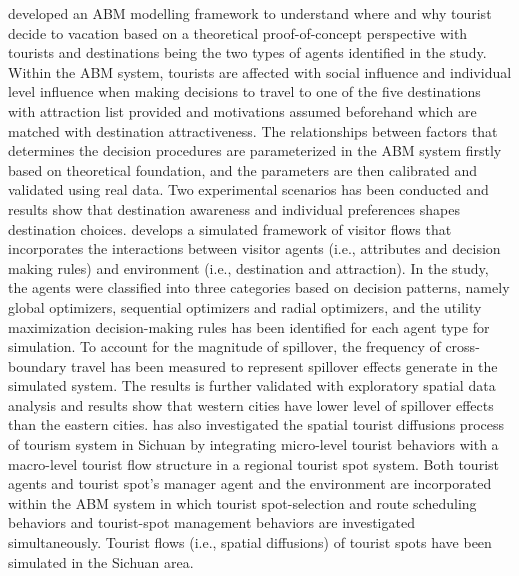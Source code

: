 \documentclass[11pt,a4paper]{amsart}
\theoremstyle{plain}
\theoremstyle{definition}
\begin{document}
\noindent \textcite{boavida-portugalWhereVacationAgentbased2017} developed an ABM modelling framework to understand where and why tourist decide to vacation based on a theoretical proof-of-concept perspective with tourists and destinations being the two types of agents identified in the study. Within the ABM system, tourists are affected with social influence and individual level influence when making decisions to travel to one of the five destinations with attraction list provided and motivations assumed beforehand which are matched with destination attractiveness. The relationships between factors that determines the decision procedures are parameterized in the ABM system firstly based on theoretical foundation, and the parameters are then calibrated and validated using real data. Two experimental scenarios has been conducted and results show that destination awareness and individual preferences shapes destination choices. \textcite{liAgentBasedModelingSpatial2021} develops a simulated framework of visitor flows that incorporates the interactions between visitor agents (i.e., attributes and decision making rules) and environment (i.e., destination and attraction). In the study, the agents were classified into three categories based on decision patterns, namely global optimizers, sequential optimizers and radial optimizers, and the utility maximization decision-making rules has been identified for each agent type for simulation. To account for the magnitude of spillover, the frequency of cross-boundary travel has been measured to represent spillover effects generate in the simulated system. The results is further validated with exploratory spatial data analysis and results show that western cities have lower level of spillover effects than the eastern cities. \textcite{qiuAgentbasedModelingSpatial2016} has also investigated the spatial tourist diffusions process of tourism system in Sichuan by integrating micro-level tourist behaviors with a macro-level tourist flow structure in a regional tourist spot system. Both tourist agents and tourist spot’s manager agent and the environment are incorporated within the ABM system in which tourist spot-selection and route scheduling behaviors and tourist-spot management behaviors are investigated simultaneously. Tourist flows (i.e., spatial diffusions) of tourist spots have been simulated in the Sichuan area.
\end{document}
